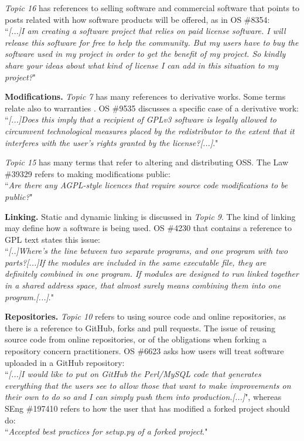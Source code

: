 \documentclass{elsarticle}
\begin{document}
\emph{Topic 16} has references to selling software and commercial software that points to posts related with how software products will be offered, as in OS \#8354:\\
``\emph{[...]I am creating a software project that relies on paid license software. I will release this software for free to help the community. But my users have to buy the software used in my project in order to get the benefit of my project. So kindly share your ideas about what kind of license I can add in this situation to my project?}"

\textbf{Modifications.} \emph{Topic 7} has many references to derivative works. Some terms relate also to warranties%
. OS \#9535 discusses a specific case of a derivative work:\\
``\emph{[...]Does this imply that a recipient of GPLv3 software is legally allowed to circumvent technological measures placed by the redistributor to the extent that it interferes with the user's rights granted by the license?[...]}."

\emph{Topic 15} has many terms that refer to altering and distributing OSS. The Law \#39329 refers to making modifications public:\\
``\emph{Are there any AGPL-style licences that require source code modifications to be public?}"%

\textbf{Linking.} Static and dynamic linking is discussed in \emph{Topic 9}. The kind of linking may define how a software is being used. OS \#4230 that contains a reference to GPL text states this issue:\\
``\emph{[..]Where's the line between two separate programs, and one program with two parts?[...]If the modules are included in the same executable file, they are definitely combined in one program. If modules are designed to run linked together in a shared address space, that almost surely means combining them into one program.[...]}."

\textbf{Repositories.} \emph{Topic 10} refers to using source code and online repositories, as there is a reference to GitHub, forks and pull requests. The issue of reusing source code from online repositories, or of the obligations when forking a repository concern practitioners. OS \#6623 asks how users will treat software uploaded in a GitHub repository:\\
``\emph{[...]I would like to put on GitHub the Perl/MySQL code that generates everything that the users see to allow those that want to make improvements on their own to do so and I can simply push them into production.[...]}", whereas SEng \#197410 refers to how the user that has modified a forked project should do:\\
``\emph{Accepted best practices for setup.py of a forked project}."
\end{document}
